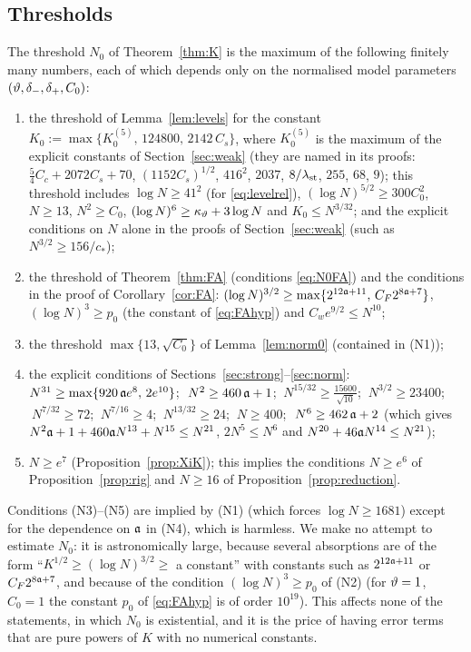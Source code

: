 \subsection{Thresholds}\label{app:N0}
The threshold $N_0$ of Theorem~\ref{thm:K} is the maximum of the following finitely many numbers, each of which depends only on the normalised model parameters $(\vartheta,\delta_-,\delta_+,C_0)$:
\begin{enumerate}[label=\textup{(N\arabic*)},leftmargin=2.8em,itemsep=1pt]
\item the threshold of Lemma~\ref{lem:levels} for the constant $K_0:=\max\{K_0^{(5)},\,124800,\,2142\,C_s\}$, where $K_0^{(5)}$ is the maximum of the explicit constants of Section~\ref{sec:weak} (they are named in its proofs:
$\frac54C_c+2072C_s+70$, $(1152C_s)^{1/2}$, $416^2$, $2037$, $8/\lambda_{\rm st}$, $255$, $68$, $9$); this threshold includes $\log N\ge41^2$ (for \eqref{eq:levelrel}), $(\log N)^{5/2}\ge300C_0^2$, $N\ge13$, $N^2\ge C_0$, $(\log N)^6\ge\kappa_\vartheta+3\log N$ and $K_0\le N^{3/32}$; and the explicit conditions on $N$ alone in the proofs of Section~\ref{sec:weak} (such as $N^{3/2}\ge156/c_*$);
\item the threshold of Theorem~\ref{thm:FA} (conditions \eqref{eq:N0FA}) and the conditions in the proof of Corollary~\ref{cor:FA}: $(\log N)^{3/2}\ge\max\{2^{12\mathfrak{a}+11},\,C_F2^{8\mathfrak{a}+7}\}$, $(\log N)^3\ge p_0$ (the constant of \eqref{eq:FAhyp}) and $C_we^{9/2}\le N^{10}$;
\item the threshold $\max\{13,\sqrt{C_0}\}$ of Lemma~\ref{lem:norm0} (contained in (N1));
\item the explicit conditions of Sections~\ref{sec:strong}--\ref{sec:norm}: $N^{31}\ge\max\{920\,\mathfrak{a} e^8,\,2e^{10}\}$; $\ N^2\ge460\,\fa+1$; $\ N^{15/32}\ge\frac{15600}{\sqrt{10}}$; $\ N^{3/2}\ge23400$; $\ N^{7/32}\ge72$; $\ N^{7/16}\ge4$; $\ N^{13/32}\ge24$; $\ N\ge400$;
$\ N^6\ge462\,\mathfrak{a}+2$ (which gives $N^2\mathfrak{a}+1+460\mathfrak{a} N^{13}+N^{15}\le N^{21}$, $2N^5\le N^6$ and $N^{20}+46\mathfrak{a} N^{14}\le N^{21}$);
\item $N\ge e^{7}$ (Proposition~\ref{prop:XiK}); this implies the conditions $N\ge e^6$ of Proposition~\ref{prop:rig} and $N\ge16$ of Proposition~\ref{prop:reduction}.
\end{enumerate}
Conditions (N3)--(N5) are implied by (N1) (which forces $\log N\ge1681$) except for the dependence on $\mathfrak{a}$ in (N4), which is harmless. We make no attempt to estimate $N_0$: it is astronomically large, because several absorptions are of the form
``$K^{1/2}\ge(\log N)^{3/2}\ge$ a constant'' with constants such as $2^{12\mathfrak{a}+11}$ or $C_F2^{8\mathfrak{a}+7}$, and because of the condition $(\log N)^3\ge p_0$ of (N2)
(for $\vartheta=1$, $C_0=1$ the constant $p_0$ of \eqref{eq:FAhyp} is of order $10^{19}$). This affects none of the statements, in which $N_0$ is existential, and it is the price of having error terms that are pure powers of $K$ with no numerical constants.

